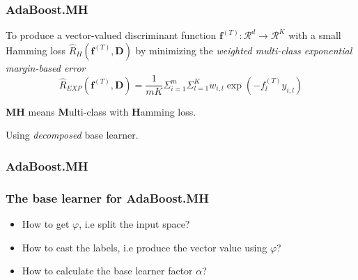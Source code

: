\documentclass{beamer}
\begin{document}
\begin{frame}
\frametitle{AdaBoost.MH}
To produce a vector-valued discriminant function $\mathbf{f}^{(T)} : \mathcal{R}^d \rightarrow \mathcal{R}^K$ with a small Hamming loss $\hat{R}_H (\mathbf{f}^{(T)}, \mathbf{D})$ by minimizing the \textit{weighted multi-class exponential margin-based error}
$$\hat{R}_{EXP}(\mathbf{f}^{(T)}, \mathbf{D}) = \frac{1}{mK} {{\Sigma}_{i=1}^m} {{\Sigma}_{l=1}^K} {w_{i,l}\exp(- f_l^{(T)} y_{i,l})}$$

\begin{block}{}
\textbf{MH} means \textbf{M}ulti-class with \textbf{H}amming loss.
\end{block}

\begin{block}{}
Using \textit{decomposed} base learner.
\end{block}
\end{frame}

\begin{frame}
\frametitle{AdaBoost.MH}
\begin{algorithm}[H]
\end{algorithm}
\end{frame}

\begin{frame}
\frametitle{The base learner for AdaBoost.MH}
\begin{itemize}
\item How to get $\varphi$, i.e split the input space?
\item How to cast the labels, i.e produce the vector value using  $\varphi$?
\item How to calculate the base learner factor $\alpha$?
\end{itemize}
\end{frame}
\end{document}
